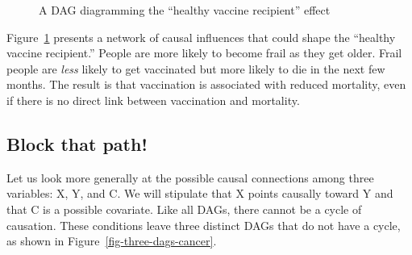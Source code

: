 \documentclass[
  letterpaper,
  DIV=11,
  numbers=noendperiod,
  oneside]{scrartcl}
\begin{document}
\begin{tcolorbox}
\begin{figure}[H]

\caption{\label{fig-healthy-vaccine}A DAG diagramming the ``healthy
vaccine recipient'' effect}

\end{figure}%

Figure~\ref{fig-healthy-vaccine} presents a network of causal influences
that could shape the ``healthy vaccine recipient.'' People are more
likely to become frail as they get older. Frail people are \emph{less}
likely to get vaccinated but more likely to die in the next few months.
The result is that vaccination is associated with reduced mortality,
even if there is no direct link between vaccination and mortality.

\end{tcolorbox}

\subsection{Block that path!}\label{block-that-path}

Let us look more generally at the possible causal connections among
three variables: X, Y, and C. We will stipulate that X points causally
toward Y and that C is a possible covariate. Like all DAGs, there cannot
be a cycle of causation. These conditions leave three distinct DAGs that
do not have a cycle, as shown in Figure~\ref{fig-three-dags-cancer}.
\end{document}
